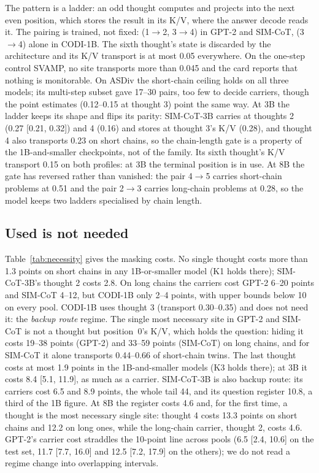 \documentclass{article}
\begin{document}
The pattern is a ladder: an odd thought computes and projects into the next even position, which stores the result in its K/V, where the answer decode reads it. The pairing is trained, not fixed: (1$\to$2, 3$\to$4) in GPT-2 and SIM-CoT, (3$\to$4) alone in CODI-1B. The sixth thought's state is discarded by the architecture and its K/V transport is at most 0.05 everywhere. On the one-step control SVAMP, no site transports more than 0.045 and the card reports that nothing is monitorable. On ASDiv the short-chain ceiling holds on all three models; its multi-step subset gave 17--30 pairs, too few to decide carriers, though the point estimates (0.12--0.15 at thought 3) point the same way. At 3B the ladder keeps its shape and flips its parity: SIM-CoT-3B carries at thoughts 2 (0.27 [0.21, 0.32]) and 4 (0.16) and stores at thought 3's K/V (0.28), and thought 4 also transports 0.23 on short chains, so the chain-length gate is a property of the 1B-and-smaller checkpoints, not of the family. Its sixth thought's K/V transport 0.15 on both profiles: at 3B the terminal position is in use. At 8B the gate has reversed rather than vanished: the pair 4$\to$5 carries short-chain problems at 0.51 and the pair 2$\to$3 carries long-chain problems at 0.28, so the model keeps two ladders specialised by chain length.

\subsection{Used is not needed}\label{sec:necessity}

Table~\ref{tab:necessity} gives the masking costs. No single thought costs more than 1.3 points on short chains in any 1B-or-smaller model (K1 holds there); SIM-CoT-3B's thought 2 costs 2.8. On long chains the carriers cost GPT-2 6--20 points and SIM-CoT 4--12, but CODI-1B only 2--4 points, with upper bounds below 10 on every pool. CODI-1B uses thought 3 (transport 0.30--0.35) and does not need it: the \emph{backup route} regime. The single most necessary site in GPT-2 and SIM-CoT is not a thought but position~0's K/V, which holds the question: hiding it costs 19--38 points (GPT-2) and 33--59 points (SIM-CoT) on long chains, and for SIM-CoT it alone transports 0.44--0.66 of short-chain twins. The last thought costs at most 1.9 points in the 1B-and-smaller models (K3 holds there); at 3B it costs 8.4 [5.1, 11.9], as much as a carrier. SIM-CoT-3B is also backup route: its carriers cost 6.5 and 8.9 points, the whole tail 44, and its question register 10.8, a third of the 1B figure. At 8B the register costs 4.6 and, for the first time, a thought is the most necessary single site: thought 4 costs 13.3 points on short chains and 12.2 on long ones, while the long-chain carrier, thought 2, costs 4.6. GPT-2's carrier cost straddles the 10-point line across pools (6.5 [2.4, 10.6] on the test set, 11.7 [7.7, 16.0] and 12.5 [7.2, 17.9] on the others); we do not read a regime change into overlapping intervals.
\end{document}
